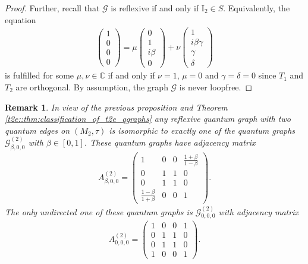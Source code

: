 \documentclass{amsart}
\newtheorem{remark}[thm]{Remark}
\newcommand{\C}{\mathbb{C}}
\begin{document}
\begin{proof}
    Further, recall that $\mathcal{G}$ is reflexive if and only if $\mathrm{I}_2\in S$. Equivalently, the equation
    \begin{align*}
        \begin{pmatrix}
            1\\0\\0\\0
        \end{pmatrix}
        =\mu\begin{pmatrix}
            0\\1\\i\beta\\0
        \end{pmatrix}
        +\nu\begin{pmatrix}
            1\\i\beta\gamma\\ \gamma\\ \delta
        \end{pmatrix}
    \end{align*}
    is fulfilled for some $\mu,\nu\in\C$ if and only if
    $\nu=1$, $\mu=0$ and $\gamma=\delta=0$ since $T_1$ and $T_2$ are orthogonal.
    By assumption, the graph $\mathcal{G}$ is never loopfree.
\end{proof}


\begin{remark}
    In view of the previous proposition and Theorem \ref{t2e::thm:classification_of_t2e_qgraphs} any reflexive quantum graph with two quantum edges on $(M_2, \tau)$ is isomorphic to exactly one of the quantum graphs $\mathcal{G}_{\beta, 0, 0}^{(2)}$ with $\beta \in [0,1]$. These quantum graphs have adjacency matrix
    \begin{align*}
        A_{\beta,0,0}^{(2)}
        =
        \begin{pmatrix}
            1&0&0&\frac{1+\beta}{1-\beta}\\
            0&1&1&0\\
            0&1&1&0\\
            \frac{1-\beta}{1+\beta}&0&0&1
        \end{pmatrix}.
    \end{align*}
    The only undirected one of these quantum graphs is $\mathcal{G}_{0,0,0}^{(2)}$ with adjacency matrix
    \begin{align*}
        A_{0,0,0}^{(2)}
        =
        \begin{pmatrix}
            1&0&0&1\\
            0&1&1&0\\
            0&1&1&0\\
            1&0&0&1
        \end{pmatrix}.
    \end{align*}
\end{remark}
\end{document}
